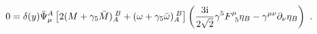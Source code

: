 \begin{equation} \label{omegamasa}
  0=\delta(y)\bar{\Psi}_\mu^A\left[2(M+\gamma_5\bar{M})_{A}^{\;B}+(\omega+\gamma_5\bar{\omega})_{A}^{\;B}\right]\left(\frac{3{\rm i}}{2\sqrt{2}}\gamma^5F^\mu_{\;\;5}\eta_B-\gamma^{\mu\nu}\partial_\nu\eta_B\right)\ .
  \end{equation} 
